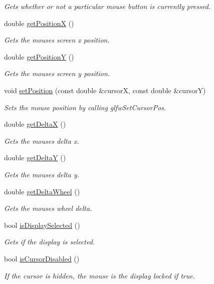 \begin{DoxyCompactItemize}
\begin{DoxyCompactList}\small\item\em Gets whether or not a particular mouse button is currently pressed. \end{DoxyCompactList}\item 
double \hyperlink{classflounder_1_1mouse_ab1f034dd18edcd5099615b7a1958b71d}{get\+PositionX} ()
\begin{DoxyCompactList}\small\item\em Gets the mouses screen x position. \end{DoxyCompactList}\item 
double \hyperlink{classflounder_1_1mouse_adbb426aed882bf8919171e263bd038f3}{get\+PositionY} ()
\begin{DoxyCompactList}\small\item\em Gets the mouses screen y position. \end{DoxyCompactList}\item 
void \hyperlink{classflounder_1_1mouse_a47fae906e36e62f4cfd5939b37a0476c}{set\+Position} (const double \&cursorX, const double \&cursorY)
\begin{DoxyCompactList}\small\item\em Sets the mouse position by calling glfw\+Set\+Cursor\+Pos. \end{DoxyCompactList}\item 
double \hyperlink{classflounder_1_1mouse_ac4109903ff369214a5b6466a014d04dd}{get\+DeltaX} ()
\begin{DoxyCompactList}\small\item\em Gets the mouses delta x. \end{DoxyCompactList}\item 
double \hyperlink{classflounder_1_1mouse_a97c8ce905344917d6b57d9c0c0ea532a}{get\+DeltaY} ()
\begin{DoxyCompactList}\small\item\em Gets the mouses delta y. \end{DoxyCompactList}\item 
double \hyperlink{classflounder_1_1mouse_aca4c4c0498247db6fafef3ad7fb7a729}{get\+Delta\+Wheel} ()
\begin{DoxyCompactList}\small\item\em Gets the mouses wheel delta. \end{DoxyCompactList}\item 
bool \hyperlink{classflounder_1_1mouse_a68cff5b3c6384eda1048db5894d65887}{is\+Display\+Selected} ()
\begin{DoxyCompactList}\small\item\em Gets if the display is selected. \end{DoxyCompactList}\item 
bool \hyperlink{classflounder_1_1mouse_a84181116f71d9f8e3c01afca2aa2554f}{is\+Cursor\+Disabled} ()
\begin{DoxyCompactList}\small\item\em If the cursor is hidden, the mouse is the display locked if true. \end{DoxyCompactList}\end{DoxyCompactItemize}
